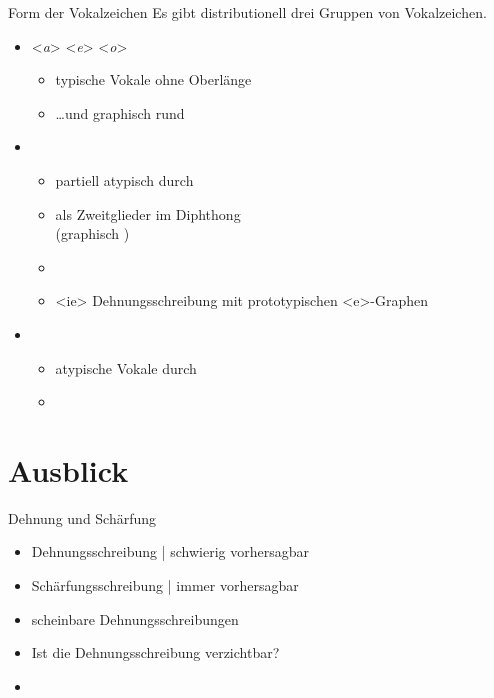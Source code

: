 \begin{frame}
  {Form der Vokalzeichen}
  \onslide<+->
  \onslide<+->
  Es gibt distributionell drei Gruppen von Vokalzeichen.\\
  \Zeile
  \begin{itemize}[<+->]
    \item \alert{<\textit{a}> <\textit{e}> <\textit{o}>}
      \begin{itemize}[<+->]
        \item typische Vokale \alert{ohne Oberlänge}
        \item \ldots und \alert{graphisch rund}
      \end{itemize}
      \Halbzeile
    \item {}
      \begin{itemize}[<+->]
        \item partiell atypisch durch 
        \item als Zweitglieder im Diphthong \\
          (graphisch )
        \item {}
        \item{} <ie> Dehnungsschreibung mit prototypischen <e>-Graphen
      \end{itemize}
      \Halbzeile
    \item {}
      \begin{itemize}[<+->]
        \item atypische Vokale durch 
        \item {}
      \end{itemize}
  \end{itemize}
\end{frame}


\section{Ausblick}

\begin{frame}
  {Dehnung und Schärfung}
  \onslide<+->
  \begin{itemize}[<+->]
    \item Dehnungsschreibung | schwierig vorhersagbar
    \item Schärfungsschreibung | immer vorhersagbar
    \item scheinbare Dehnungsschreibungen
    \item Ist die Dehnungsschreibung verzichtbar?
      \Zeile
    \item \citet[Kapitel~15]{Schaefer2018b}
  \end{itemize}
\end{frame}
